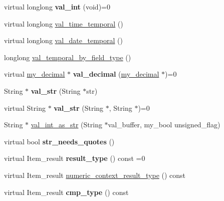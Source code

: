 \begin{DoxyCompactItemize}
\item 
\mbox{\label{classField_a3b2982644b7ba2bc91c6b34ba1cfdf59}} 
virtual longlong {\bfseries val\+\_\+int} (void)=0
\item 
virtual longlong \mbox{\hyperlink{classField_a504ae8be08face4684852eaa79734158}{val\+\_\+time\+\_\+temporal}} ()
\item 
virtual longlong \mbox{\hyperlink{classField_a85b7713df40509aaa467a75eb3945614}{val\+\_\+date\+\_\+temporal}} ()
\item 
longlong \mbox{\hyperlink{classField_a8317ba4d14c4ca783bfd657fc64070a3}{val\+\_\+temporal\+\_\+by\+\_\+field\+\_\+type}} ()
\item 
\mbox{\label{classField_a7f3f73b233dcac88de50548c97adf05a}} 
virtual \mbox{\hyperlink{classmy__decimal}{my\+\_\+decimal}} $\ast$ {\bfseries val\+\_\+decimal} (\mbox{\hyperlink{classmy__decimal}{my\+\_\+decimal}} $\ast$)=0
\item 
\mbox{\label{classField_af6da9e43b08c4ceca4de4a9757c49aa9}} 
String $\ast$ {\bfseries val\+\_\+str} (String $\ast$str)
\item 
\mbox{\label{classField_a35dbc1a907c4e234595c3fee19266a5a}} 
virtual String $\ast$ {\bfseries val\+\_\+str} (String $\ast$, String $\ast$)=0
\item 
String $\ast$ \mbox{\hyperlink{classField_a180aa83c030df25313f083557b05c15b}{val\+\_\+int\+\_\+as\+\_\+str}} (String $\ast$val\+\_\+buffer, my\+\_\+bool unsigned\+\_\+flag)
\item 
\mbox{\label{classField_a84a62e36b14d3fab94411fad5b48d1bd}} 
virtual bool {\bfseries str\+\_\+needs\+\_\+quotes} ()
\item 
\mbox{\label{classField_a90589566c16ccc08ae1c0a2a50ed9f74}} 
virtual Item\+\_\+result {\bfseries result\+\_\+type} () const =0
\item 
virtual Item\+\_\+result \mbox{\hyperlink{classField_a834475c74f6d0812dc4aa1abfc483a7f}{numeric\+\_\+context\+\_\+result\+\_\+type}} () const
\item 
\mbox{\label{classField_ab67c3701037c5918eecd909befae4642}} 
virtual Item\+\_\+result {\bfseries cmp\+\_\+type} () const
\item 

\end{DoxyCompactItemize}
